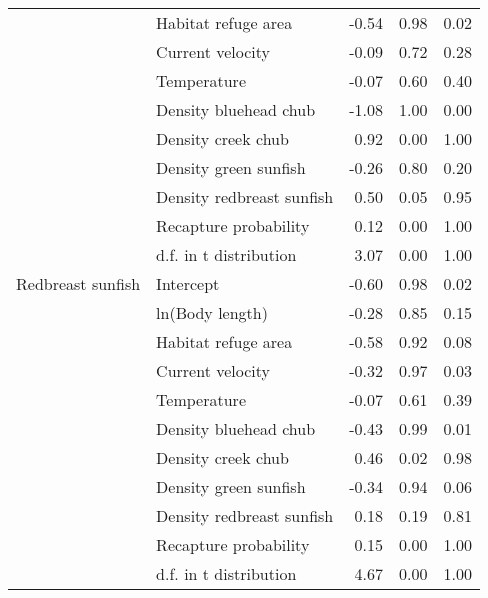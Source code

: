 \begin{table}[ht]
\begin{tabular}{llrrr}
   & Habitat refuge area & -0.54 & 0.98 & 0.02 \\ 
   & Current velocity & -0.09 & 0.72 & 0.28 \\ 
   & Temperature & -0.07 & 0.60 & 0.40 \\ 
   & Density bluehead chub & -1.08 & 1.00 & 0.00 \\ 
   & Density creek chub & 0.92 & 0.00 & 1.00 \\ 
   & Density green sunfish & -0.26 & 0.80 & 0.20 \\ 
   & Density redbreast sunfish & 0.50 & 0.05 & 0.95 \\ 
   & Recapture probability & 0.12 & 0.00 & 1.00 \\ 
   & d.f. in t distribution & 3.07 & 0.00 & 1.00 \\ 
  Redbreast sunfish & Intercept & -0.60 & 0.98 & 0.02 \\ 
   & ln(Body length) & -0.28 & 0.85 & 0.15 \\ 
   & Habitat refuge area & -0.58 & 0.92 & 0.08 \\ 
   & Current velocity & -0.32 & 0.97 & 0.03 \\ 
   & Temperature & -0.07 & 0.61 & 0.39 \\ 
   & Density bluehead chub & -0.43 & 0.99 & 0.01 \\ 
   & Density creek chub & 0.46 & 0.02 & 0.98 \\ 
   & Density green sunfish & -0.34 & 0.94 & 0.06 \\ 
   & Density redbreast sunfish & 0.18 & 0.19 & 0.81 \\ 
   & Recapture probability & 0.15 & 0.00 & 1.00 \\ 
   & d.f. in t distribution & 4.67 & 0.00 & 1.00 \\ 
   \hline
\end{tabular}
\end{table}

